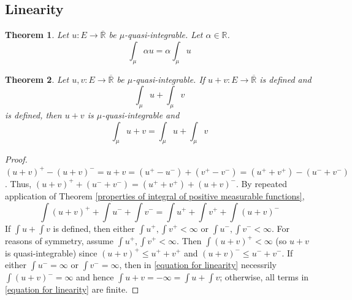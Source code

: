 \documentclass[11pt, a4paper, openany]{book}
\newtheorem{thm}{Theorem}\newtheorem{lem}{Lemma}\newtheorem{crl}{Corollary}
\theoremstyle{definition}
\newcommand{\er}{\overline{\mathbb{R}}}
\begin{document}
\subsection{Linearity}
    \begin{thm}\label{homogeneity}
        Let $u:E\rightarrow \er$ be $\mu$-quasi-integrable. Let $\alpha\in\mathbb{R}$.
        \[
            \int_\mu\alpha u=\alpha\int_\mu u
        \]
    \end{thm}
    \begin{thm}\label{additivity}
        Let $u,v:E\rightarrow \er$ be $\mu$-quasi-integrable. If $u+v:E\rightarrow \er$ is defined and
        \[
            \int_\mu u+\int_\mu v
        \]
        is defined, then $u+v$ is $\mu$-quasi-integrable and
        \[
            \int_\mu u+v=\int_\mu u+\int_\mu v
        \]
    \end{thm}
    \begin{proof}
        $({u}+{v})^+-({u}+{v})^-={u}+{v}=({u}^+-{u}^-)+({v}^+-{v}^-)=({u}^++{v}^+)-({u}^-+{v}^-)$. Thus, $({u}+{v})^++({u}^-+{v}^-)=({u}^++{v}^+)+({u}+{v})^-$. By repeated application of Theorem \ref{properties of integral of positive measurable functions}, 
        \begin{equation}\label{equation for linearity}
            \int ({u}+{v})^++\int {u}^-+\int {v}^-=\int{u}^++\int{v}^++\int({u}+{v})^-
        \end{equation}
        If $\int u+\int v$ is defined, then either $\int u^+,\int v^+<\infty$ or $\int u^-,\int v^-<\infty$. For reasons of symmetry, assume $\int u^+,\int v^+<\infty$. Then $\int (u+v)^+<\infty$ (so $u+v$ is quasi-integrable) since $(u+v)^+\leqslant u^++v^+$ and $(u+v)^-\leqslant u^-+v^-$. If either $\int u^-=\infty$ or $\int v^-=\infty$, then in \eqref{equation for linearity} necessrily $\int (u+v)^-=\infty$ and hence $\int u+v=-\infty=\int u +\int v$; otherwise, all terms in \eqref{equation for linearity} are finite.
    \end{proof}
\end{document}
